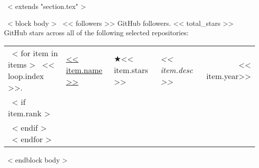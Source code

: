 ~< extends "section.tex" >~

~< block body >~
<< followers >> GitHub followers.
<< total_stars >> GitHub stars across all of the following selected repositories: \\

\setlength\tabcolsep{0pt}
\begin{tabular*}{\linewidth}{@{\extracolsep{\fill}} llllr}
  ~< for item in items >~
    << loop.index >>. & \href{<< item.repo_url >>}{<< item.name >>} & $\bigstar$<< item.stars >> & \emph{<< item.desc >>} & << item.year>> \\
    ~< if item.rank >~
     & \multicolumn{4}{l}{\scriptsize \color{gray}{Rank \#<< item.rank >> among all contributors with << item.commits >> commits, << item.additons >> lines of additions and << item.deletions >> lines of deletions}} \\
    ~< endif >~
  ~< endfor >~
\end{tabular*}
~< endblock body >~
